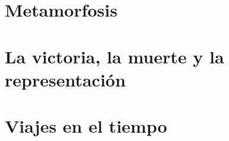 \chapter{Metamorfosis}

\chapter{La victoria, la muerte y la representación}

\chapter{Viajes en el tiempo}
%
%
%
%
%
%
%
%
%
